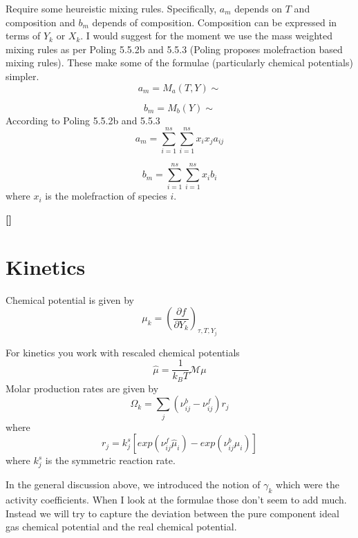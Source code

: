 \documentclass[11pt]{article}
\newcommand{\jbb}[1]{{\bf[{\color{red}{JBB:  #1}}]}}
\begin{document}
Require some heureistic mixing rules.
  Specifically, $a_m$ depends on $T$ and composition and $b_m$ depends of composition.  Composition
can be expressed in terms of $Y_k$ or $X_k$.  I would suggest for the moment we use the mass weighted
mixing rules as per Poling 5.5.2b and 5.5.3 (Poling proposes molefraction based mixing rules).  These make some of the formulae (particularly chemical
potentials) simpler.  
\begin{equation}
    a_m = M_a(T, Y) \sim 
\end{equation}

\begin{equation}
    b_m = M_b(Y) \sim 
\end{equation}
According to Poling 5.5.2b and 5.5.3
\begin{equation}
    a_m = \sum_{i=1}^{ns}  \sum_{i=1}^{ns} x_i x_j a_{ij}
\end{equation}

\begin{equation}
    b_m = \sum_{i=1}^{ns}  \sum_{i=1}^{ns} x_i b_i
\end{equation}
where $x_i$ is the molefraction of species $i$. 

\jbb{seems like we should be working in this form.

We will still need gradients wrt $Y_k$.  This is best done using 
\[
\nabla_Y a(X,T) = \nabla_X a(X,T) \frac{\partial X}{\partial Y} = \frac{\partial a}{\partial X}
(\mathcal{Y}- Y Y^T ) \mathcal{X}^{-1}
\]
}

\section{Kinetics}

Chemical potential is given by
\[
\mu_k = \left( \frac{\partial f}{\partial Y_k}\right)_{\tau,T,Y_j}
\]

For kinetics you work with rescaled chemical potentials
\[
\hat{\mu} = \frac{1}{k_B T} \mathcal{M} \mu
\]
Molar production rates are given by
\[
\Omega_k = \sum_j (\nu_{ij}^b - \nu_{ij}^f) r_j
\]
where 
\[
r_j = k_j^s \left [ exp(\nu_{ij}^f \hat{\mu}_i) - exp ( \nu_{ij}^b \hat{\mu}_i) \right ] 
\]
where $k_j^s$ is the symmetric reaction rate.

In the general discussion above, we introduced the notion of
$\gamma_k$ which were the activity coefficients.
When I look at the formulae those don't seem to add much.
Instead we will try to capture the deviation between the pure component ideal gas chemical potential and
the real chemical potential.
\end{document}
